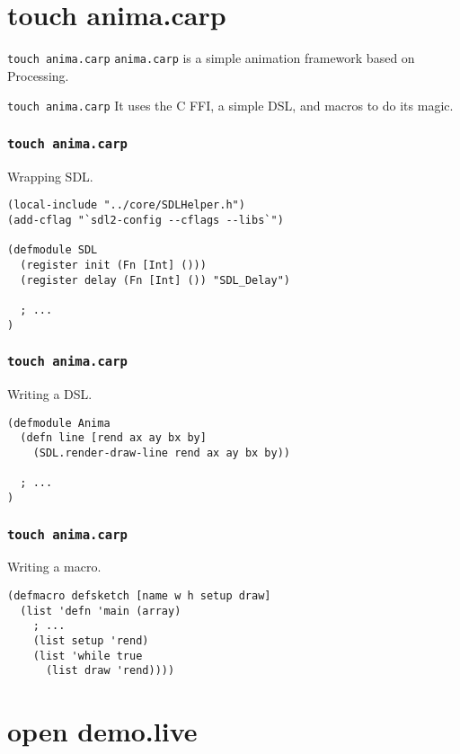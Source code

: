 \documentclass[aspectratio=169]{beamer}
\begin{document}
  \section{touch anima.carp}
  \begin{frame}{\texttt{touch anima.carp}}
    \texttt{anima.carp} is a simple animation framework based on Processing.
  \end{frame}
  \begin{frame}{\texttt{touch anima.carp}}
    It uses the C FFI, a simple DSL, and macros to do its magic.
  \end{frame}
  \begin{frame}[fragile]
    \frametitle{\texttt{touch anima.carp}}
    \begin{listing}[H]
      \caption{Wrapping SDL.}
      \begin{verbatim}
(local-include "../core/SDLHelper.h")
(add-cflag "`sdl2-config --cflags --libs`")

(defmodule SDL
  (register init (Fn [Int] ()))
  (register delay (Fn [Int] ()) "SDL_Delay")

  ; ...
)
      \end{verbatim}
    \end{listing}
  \end{frame}
  \begin{frame}[fragile]
    \frametitle{\texttt{touch anima.carp}}
    \begin{listing}[H]
      \caption{Writing a DSL.}
      \begin{verbatim}
(defmodule Anima
  (defn line [rend ax ay bx by]
    (SDL.render-draw-line rend ax ay bx by))

  ; ...
)
      \end{verbatim}
    \end{listing}
  \end{frame}
  \begin{frame}[fragile]
    \frametitle{\texttt{touch anima.carp}}
    \begin{listing}[H]
      \caption{Writing a macro.}
      \begin{verbatim}
(defmacro defsketch [name w h setup draw]
  (list 'defn 'main (array)
    ; ...
    (list setup 'rend)
    (list 'while true
      (list draw 'rend))))
      \end{verbatim}
    \end{listing}
  \end{frame}
  \section{open demo.live}
\end{document}
